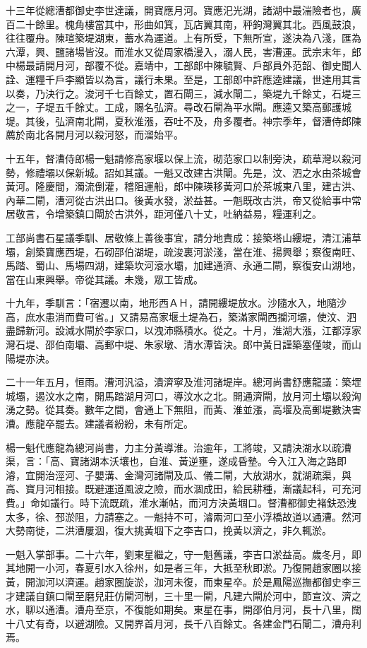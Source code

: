 十三年從總漕都御史李世達議，開寶應月河。寶應汜光湖，諸湖中最湍險者也，廣百二十餘里。槐角樓當其中，形曲如箕，瓦店翼其南，秤鉤灣翼其北。西風鼓浪，往往覆舟。陳瑄築堤湖東，蓄水為運道。上有所受，下無所宣，遂決為八淺，匯為六潭，興、鹽諸場皆沒。而淮水又從周家橋漫入，溺人民，害漕運。武宗末年，郎中楊最請開月河，部覆不從。嘉靖中，工部郎中陳毓賢、戶部員外范韶、御史聞人詮、運糧千戶李顯皆以為言，議行未果。至是，工部郎中許應逵建議，世達用其言以奏，乃決行之。浚河千七百餘丈，置石閘三，減水閘二，築堤九千餘丈，石堤三之一，子堤五千餘丈。工成，賜名弘濟。尋改石閘為平水閘。應逵又築高郵護城堤。其後，弘濟南北閘，夏秋淮漲，吞吐不及，舟多覆者。神宗季年，督漕侍郎陳薦於南北各開月河以殺河怒，而溜始平。

十五年，督漕侍郎楊一魁請修高家堰以保上流，砌范家口以制旁決，疏草灣以殺河勢，修禮壩以保新城。詔如其議。一魁又改建古洪閘。先是，汶、泗之水由茶城會黃河。隆慶間，濁流倒灌，稽阻運船，郎中陳瑛移黃河口於茶城東八里，建古洪、內華二閘，漕河從古洪出口。後黃水發，淤益甚。一魁既改古洪，帝又從給事中常居敬言，令增築鎮口閘於古洪外，距河僅八十丈，吐納益易，糧運利之。

工部尚書石星議季馴、居敬條上善後事宜，請分地責成：接築塔山縷堤，清江浦草壩，創築寶應西堤，石砌邵伯湖堤，疏浚裏河淤淺，當在淮、揚興舉；察復南旺、馬踏、蜀山、馬場四湖，建築坎河滾水壩，加建通濟、永通二閘，察復安山湖地，當在山東興舉。帝從其議。未幾，眾工皆成。

十九年，季馴言：「宿遷以南，地形西ＡＨ，請開縷堤放水。沙隨水入，地隨沙高，庶水患消而費可省。」又請易高家堰土堤為石，築滿家閘西攔河壩，使汶、泗盡歸新河。設減水閘於李家口，以洩沛縣積水。從之。十月，淮湖大漲，江都淳家灣石堤、邵伯南壩、高郵中堤、朱家墩、清水潭皆決。郎中黃日謹築塞僅竣，而山陽堤亦決。

二十一年五月，恒雨。漕河汎溢，潰濟寧及淮河諸堤岸。總河尚書舒應龍議：築堽城壩，遏汶水之南，開馬踏湖月河口，導汶水之北。開通濟閘，放月河土壩以殺洶湧之勢。從其奏。數年之間，會通上下無阻，而黃、淮並漲，高堰及高郵堤數決害漕。應龍卒罷去。建議者紛紛，未有所定。

楊一魁代應龍為總河尚書，力主分黃導淮。治逾年，工將竣，又請決湖水以疏漕渠，言：「高、寶諸湖本沃壤也，自淮、黃逆壅，遂成昏墊。今入江入海之路即濬，宜開治涇河、子嬰溝、金灣河諸閘及瓜、儀二閘，大放湖水，就湖疏渠，與高、寶月河相接。既避運道風波之險，而水涸成田，給民耕種，漸議起科，可充河費。」命如議行。時下流既疏，淮水漸帖，而河方決黃堌口。督漕都御史褚鈇恐洩太多，徐、邳淤阻，力請塞之。一魁持不可，濬兩河口至小浮橋故道以通漕。然河大勢南徙，二洪漕屢涸，復大挑黃堌下之李吉口，挽黃以濟之，非久輒淤。

一魁入掌部事。二十六年，劉東星繼之，守一魁舊議，李吉口淤益高。歲冬月，即其地開一小河，春夏引水入徐州，如是者三年，大抵至秋即淤。乃復開趙家圈以接黃，開泇河以濟運。趙家圈旋淤，泇河未復，而東星卒。於是鳳陽巡撫都御史李三才建議自鎮口閘至磨兒莊仿閘河制，三十里一閘，凡建六閘於河中，節宣汶、濟之水，聊以通漕。漕舟至京，不復能如期矣。東星在事，開邵伯月河，長十八里，闊十八丈有奇，以避湖險。又開界首月河，長千八百餘丈。各建金門石閘二，漕舟利焉。

